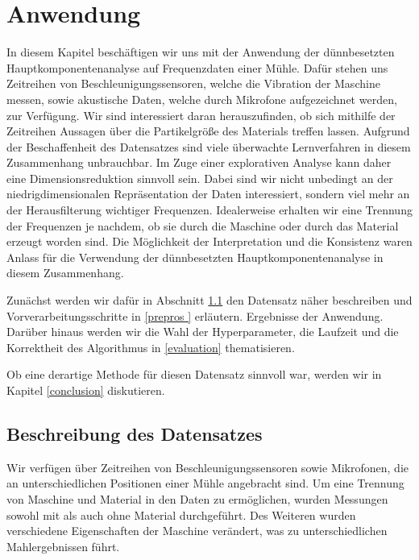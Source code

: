 \chapter{Anwendung}

\label{application}

In diesem Kapitel beschäftigen wir uns mit der Anwendung der dünnbesetzten Hauptkomponentenanalyse auf Frequenzdaten einer Mühle. Dafür stehen uns Zeitreihen von Beschleunigungssensoren, welche die Vibration der Maschine messen, sowie akustische Daten, welche durch Mikrofone aufgezeichnet werden, zur Verfügung. Wir sind interessiert daran herauszufinden, ob sich mithilfe der Zeitreihen Aussagen über die Partikelgröße des Materials treffen lassen. Aufgrund der Beschaffenheit des Datensatzes sind viele überwachte Lernverfahren in diesem Zusammenhang unbrauchbar. Im Zuge einer explorativen Analyse kann daher eine Dimensionsreduktion sinnvoll sein. Dabei sind wir nicht unbedingt an der niedrigdimensionalen Repräsentation der Daten interessiert, sondern viel mehr an der Herausfilterung wichtiger Frequenzen. Idealerweise erhalten wir eine Trennung der Frequenzen je nachdem, ob sie durch die Maschine oder durch das Material erzeugt worden sind. Die Möglichkeit der Interpretation und die Konsistenz waren Anlass für die Verwendung der dünnbesetzten Hauptkomponentenanalyse in diesem Zusammenhang. 

Zunächst werden wir dafür in Abschnitt \ref{data_set} den Datensatz näher beschreiben und Vorverarbeitungsschritte in \ref{prepros
} erläutern. Ergebnisse der Anwendung. Darüber hinaus werden wir die Wahl der Hyperparameter, die Laufzeit und die Korrektheit des Algorithmus in \ref{evaluation} thematisieren.

Ob eine derartige Methode für diesen Datensatz sinnvoll war, werden wir in Kapitel \ref{conclusion} diskutieren.




\section{Beschreibung des Datensatzes}
\label{data_set}

Wir verfügen über Zeitreihen von Beschleunigungssensoren sowie Mikrofonen, die an unterschiedlichen Positionen einer Mühle angebracht sind. Um eine Trennung von Maschine und Material in den Daten zu ermöglichen, wurden Messungen sowohl mit als auch ohne Material durchgeführt. Des Weiteren wurden verschiedene Eigenschaften der Maschine verändert, was zu unterschiedlichen Mahlergebnissen führt. 

